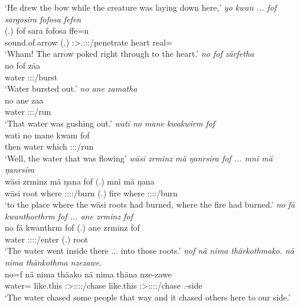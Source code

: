 \begin{exe}
	\trans `He drew the bow while the creature was laying down here,'
	\emph{yo kwan ... fof sargosira fofosa fefen}\\
	 (.) fof sara fofosa ffe=n\\ 
	sound.of.arrow (.) {\Emph} \Sg:\Sbj>\Tsg.\Masc:\Obj:\Pst:\Ipfv/penetrate heart real={\Loc}\\
	\trans `Wham! The arrow poked right through to the heart.'
	\emph{no fof zärfetha}\\
	\gll no fof zäa\\ 
	water {\Emph} \Sg:\Sbj:\Pst:\Pfv/burst\\
	\trans `Water bursted out.'
	\emph{no ane zamatha}\\
	\gll no ane zaa\\ 
	water {\Dem} \Sg:\Sbj:\Pst:\Pfv/run\\
	\trans `That water was gushing out.'
\newpage 	
{} 
	\emph{wati no mane kwakwirm fof}\\
	\gll wati no mane kwam fof\\ 
	then water which \Sg:\Sbj:\Pst:\Dur/run {\Emph}\\
	\trans `Well, the water that was flowing'
	\emph{wäsi zrminz mä ŋanrsira fof ... mni mä ŋanrsira}\\
	\gll wäsi zrminz mä ŋana fof (.) mni mä ŋana\\ 
	wäsi root where \Sg:\Sbj:\Pst:\Ipfv:\Venit/burn {\Emph} (.) fire where \Sg:\Sbj:\Pst:\Ipfv:\Venit/burn\\
	\trans `to the place where the wäsi roots had burned, where the fire had burned.'
	\emph{no fä kwanthorthrm fof ... ane zrminz fof}\\
	\gll no fä kwanthrm fof (.) ane zrminz fof\\ 
	water {\Dist} \Sg:\Sbj:\Pst:\Dur:\Venit/enter {\Emph} (.) {\Dem} root {\Emph}\\
	\trans `The water went inside there ... into those roots.'
	\emph{nof nä nima thärkothmako. nä nima thänkothma nzezawe.}\\
	\gll no=f nä nima thäako nä nima thäna nze-zawe\\ 
	water={\Erg} {\Indf} like.this \Sg:\Sbj>\Stpl:\Obj:\Pst:\Pfv:\Andat/chase {\Indf} like.this \Sg:\Sbj>\Stpl:\Obj:\Pst:\Pfv:\Venit/chase \Fnsg.\Poss-side\\
	\trans `The water chased some people that way and it chased others here to our side.'

\end{exe}

